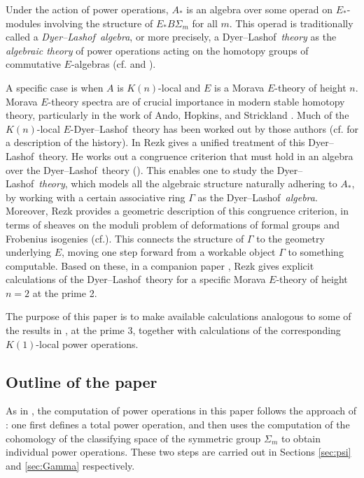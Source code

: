 \documentclass{gtpart}
\theoremstyle{definition}
\theoremstyle{remark}
\newcommand{\cff}[2]{cf.\thinspace{\cite[#1]{#2}}}
\newcommand{\DL}{Dyer--Lashof~}
\newcommand{\G}{\Gamma}
\begin{document}
Under the action of power operations, $A_*$ is an algebra over some operad on $E_*$-modules involving the structure of $E_* B\Sigma_m$ for all $m$.  
This operad is traditionally called a {\em \DL algebra}, or more precisely, 
a \DL {\em theory} as the {\em algebraic theory} of power operations acting on the homotopy groups of commutative $E$-algebras 
(\cff{Chapters III, VIII, and IX}{H_infty} and \cite[Section 9]{lpo}).  

A specific case is when $A$ is $K(n)$-local and $E$ is a Morava $E$-theory of height $n$.  
Morava $E$-theory spectra are of crucial importance in modern stable homotopy theory, 
particularly in the work of Ando, Hopkins, and Strickland \cite{cube}.  
Much of the $K(n)$-local $E$-\DL theory has been worked out by those authors (\cff{1.5}{cong} for a description of the history).  
In \cite{cong} Rezk gives a unified treatment of this \DL theory.  
He works out a congruence criterion that must hold in an algebra over the \DL theory (\cite[Theorem A]{cong}).  
This enables one to study the \DL {\em theory}, which models all the algebraic structure naturally adhering to $A_*$, 
by working with a certain associative ring $\G$ as the \DL {\em algebra}.  
Moreover, Rezk provides a geometric description of this congruence criterion, 
in terms of sheaves on the moduli problem of deformations of formal groups and Frobenius isogenies (\cff{Theorem B}{cong}).  
This connects the structure of $\G$ to the geometry underlying $E$, 
moving one step forward from a workable object $\G$ to something computable.  
Based on these, in a companion paper \cite{h2p2}, 
Rezk gives explicit calculations of the \DL theory for a specific Morava $E$-theory of height $n = 2$ at the prime 2.  

The purpose of this paper is to make available calculations analogous to some of the results in \cite{h2p2}, at the prime 3, 
together with calculations of the corresponding $K(1)$-local power operations.  


\subsection*{Outline of the paper}

As in \cite{h2p2}, the computation of power operations in this paper follows the approach of \cite{steenrod}: 
one first defines a total power operation, 
and then uses the computation of the cohomology of the classifying space of the symmetric group $\Sigma_m$ to obtain individual power operations.  
These two steps are carried out in Sections \ref{sec:psi} and \ref{sec:Gamma} respectively.  
\end{document}
